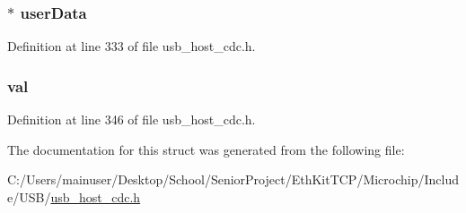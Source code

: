 \subsubsection[{user\+Data}]{$\ast$ user\+Data}\label{struct___u_s_b___c_d_c___d_e_v_i_c_e___i_n_f_o_a4b581b695075f88f61141ae73d978b57}


Definition at line 333 of file usb\+\_\+host\+\_\+cdc.\+h.

\hypertarget{struct___u_s_b___c_d_c___d_e_v_i_c_e___i_n_f_o_a5986ea8162aa0f6608b36b20964044dd}{}
\subsubsection[{val}]{ val}\label{struct___u_s_b___c_d_c___d_e_v_i_c_e___i_n_f_o_a5986ea8162aa0f6608b36b20964044dd}


Definition at line 346 of file usb\+\_\+host\+\_\+cdc.\+h.



The documentation for this struct was generated from the following file\+:\begin{DoxyCompactItemize}
\item 
C\+:/\+Users/mainuser/\+Desktop/\+School/\+Senior\+Project/\+Eth\+Kit\+T\+C\+P/\+Microchip/\+Include/\+U\+S\+B/\hyperlink{usb__host__cdc_8h}{usb\+\_\+host\+\_\+cdc.\+h}\end{DoxyCompactItemize}
